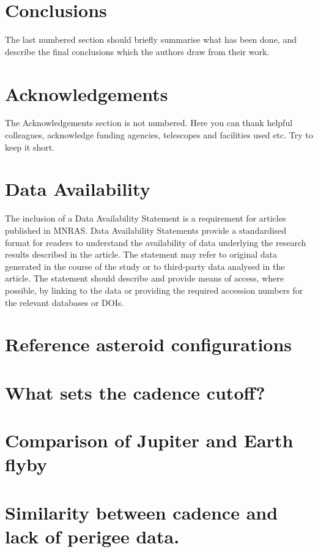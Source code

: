 \documentclass[fleqn,usenatbib]{mnras}
\begin{document}
\section{Conclusions}

The last numbered section should briefly summarise what has been done, and describe
the final conclusions which the authors draw from their work.

\section*{Acknowledgements}

The Acknowledgements section is not numbered. Here you can thank helpful
colleagues, acknowledge funding agencies, telescopes and facilities used etc.
Try to keep it short.

\section*{Data Availability}

 
The inclusion of a Data Availability Statement is a requirement for articles published in MNRAS. Data Availability Statements provide a standardised format for readers to understand the availability of data underlying the research results described in the article. The statement may refer to original data generated in the course of the study or to third-party data analysed in the article. The statement should describe and provide means of access, where possible, by linking to the data or providing the required accession numbers for the relevant databases or DOIs.










\appendix

\section{Reference asteroid configurations}
\label{app:reference-configs}




\section{What sets the cadence cutoff?}
\label{app:cadence-tests}




\section{Comparison of Jupiter and Earth flyby}
\label{app:jupiter-earth}




\section{Similarity between cadence and lack of perigee data.}
\label{app:cadence-perigee-test}


\bsp	%
\label{lastpage}
\end{document}
